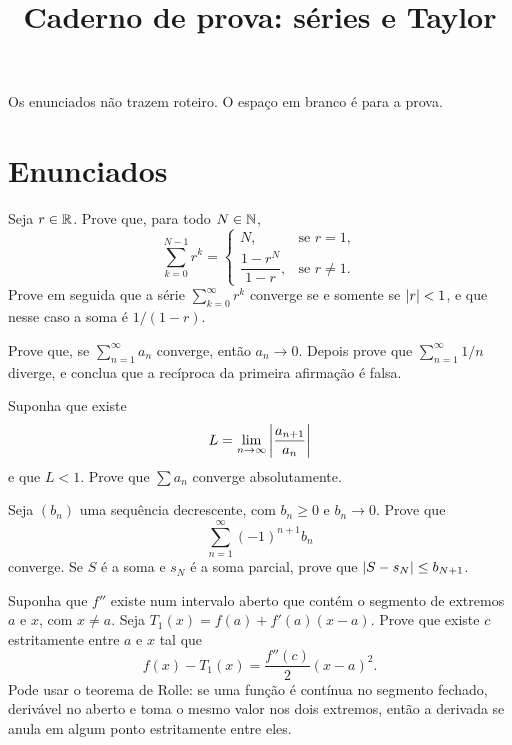 \documentclass[11pt,a4paper]{article}
\title{Caderno de prova: séries e Taylor}
\author{}
\date{}
\begin{document}
\maketitle
\tableofcontents

Os enunciados não trazem roteiro. O espaço em branco é para a prova.

\section{Enunciados}

\begin{exercicio}
Seja \(r\in\mathbb{R}\). Prove que, para todo \(N\in\mathbb{N}\),
\[
\sum_{k=0}^{N-1} r^k=
\begin{cases}
N, & \text{se }r=1,\\[0.4em]
\dfrac{1-r^N}{1-r}, & \text{se }r\neq 1.
\end{cases}
\]
Prove em seguida que a série \(\sum_{k=0}^\infty r^k\) converge se e somente se \(\left\lvert r \right\rvert<1\), e que nesse caso a soma é \(1/(1-r)\).
\end{exercicio}

\vspace{7cm}

\begin{exercicio}
Prove que, se \(\sum_{n=1}^\infty a_n\) converge, então \(a_n\to 0\). Depois prove que \(\sum_{n=1}^\infty 1/n\) diverge, e conclua que a recíproca da primeira afirmação é falsa.
\end{exercicio}

\vspace{7cm}

\begin{exercicio}
Suponha que existe
\[
L=\lim_{n\to\infty}\left\lvert \frac{a_{n+1}}{a_n} \right\rvert
\]
e que \(L<1\). Prove que \(\sum a_n\) converge absolutamente.
\end{exercicio}

\vspace{7cm}

\begin{exercicio}
Seja \((b_n)\) uma sequência decrescente, com \(b_n\ge 0\) e \(b_n\to 0\). Prove que
\[
\sum_{n=1}^\infty (-1)^{n+1} b_n
\]
converge. Se \(S\) é a soma e \(s_N\) é a soma parcial, prove que \(\left\lvert S-s_N \right\rvert\le b_{N+1}\).
\end{exercicio}

\vspace{7cm}

\begin{exercicio}
Suponha que \(f''\) existe num intervalo aberto que contém o segmento de extremos \(a\) e \(x\), com \(x\neq a\). Seja \(T_1(x)=f(a)+f'(a)(x-a)\). Prove que existe \(c\) estritamente entre \(a\) e \(x\) tal que
\[
f(x)-T_1(x)=\frac{f''(c)}{2}(x-a)^2.
\]
Pode usar o teorema de Rolle: se uma função é contínua no segmento fechado, derivável no aberto e toma o mesmo valor nos dois extremos, então a derivada se anula em algum ponto estritamente entre eles.
\end{exercicio}
\end{document}

